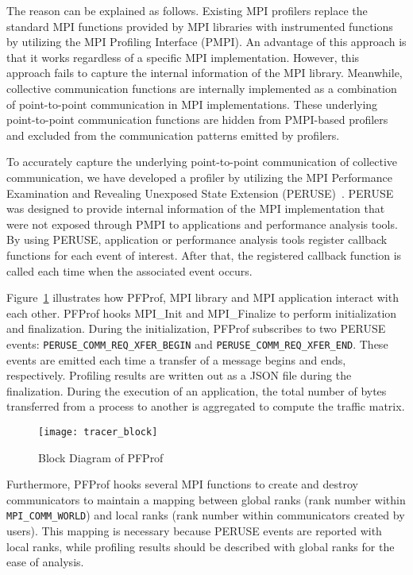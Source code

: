 The reason can be explained as follows. Existing MPI profilers replace
the standard MPI functions provided by MPI libraries with instrumented
functions by utilizing the MPI Profiling Interface (PMPI). An advantage
of this approach is that it works regardless of a specific MPI
implementation. However, this approach fails to capture the internal
information of the MPI library. Meanwhile, collective communication
functions are internally implemented as a combination of point-to-point
communication in MPI implementations. These underlying point-to-point
communication functions are hidden from PMPI-based profilers and
excluded from the communication patterns emitted by profilers.

To accurately capture the underlying point-to-point communication of
collective communication, we have developed a profiler by utilizing the
MPI Performance Examination and Revealing Unexposed State Extension
(PERUSE)~\autocite{Jones2006}. PERUSE was designed to provide internal
information of the MPI implementation that were not exposed through PMPI
to applications and performance analysis tools. By using PERUSE,
application or performance analysis tools register callback functions
for each event of interest. After that, the registered callback function
is called each time when the associated event occurs.

Figure~\ref{fig:profiler-block} illustrates how PFProf, MPI library and
MPI application interact with each other. PFProf hooks MPI\_Init and
MPI\_Finalize to perform initialization and finalization. During the
initialization, PFProf subscribes to two PERUSE events:
\lstinline!PERUSE_COMM_REQ_XFER_BEGIN! and
\lstinline!PERUSE_COMM_REQ_XFER_END!. These events are
emitted each time a transfer of a message begins and ends, respectively.
Profiling results are written out as a JSON file during the
finalization. During the execution of an application, the total number
of bytes transferred from a process to another is aggregated to compute
the traffic matrix.

\begin{figure}
    \centering
    \texttt{[image: tracer\_block]}
    \caption{Block Diagram of PFProf}%
    \label{fig:profiler-block}
\end{figure}

Furthermore, PFProf hooks several MPI functions to create and destroy
communicators to maintain a mapping between global ranks (rank number
within \lstinline!MPI_COMM_WORLD!) and local ranks (rank
number within communicators created by users). This mapping is necessary
because PERUSE events are reported with local ranks, while profiling
results should be described with global ranks for the ease of analysis.

